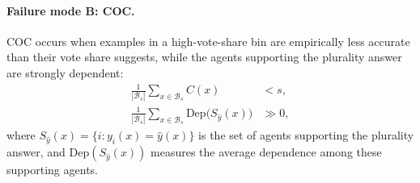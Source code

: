 \paragraph{Failure mode B: COC.}
COC occurs when examples in a high-vote-share bin are empirically less accurate than their vote share suggests, while the agents supporting the plurality answer are strongly dependent:
\begin{equation}
   \begin{aligned}
\frac{1}{|\mathcal{B}_s|}\sum_{x\in\mathcal{B}_s} C(x) &< s, \\
\frac{1}{|\mathcal{B}_s|}\sum_{x\in\mathcal{B}_s}
\mathrm{Dep}\big(S_{\hat{y}}(x)\big) &\gg 0,
\end{aligned} 
\end{equation}
where $S_{\hat{y}}(x)=\{i:y_i(x)=\hat{y}(x)\}$ is the set of agents supporting the plurality answer, and \(\mathrm{Dep}(S_{\hat{y}}(x))\) measures the average dependence among these supporting agents.




